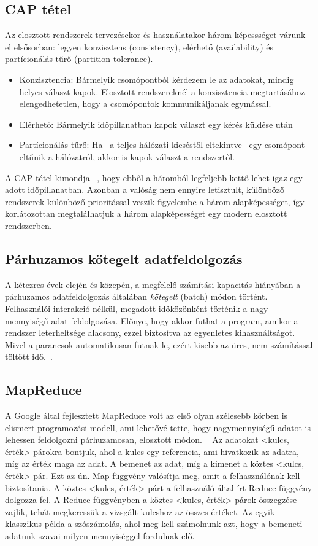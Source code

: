 \documentclass[a4paper,12pt]{article}
\begin{document}
\subsection{CAP tétel}
Az elosztott rendszerek tervezésekor és használatakor három képessséget várunk el elsősorban: legyen konzisztens (consistency), elérhető (availability) és partícionálás-tűrő (partition tolerance). 
\begin{itemize}
\item Konzisztencia: Bármelyik csomópontból kérdezem le az adatokat, mindig helyes választ kapok. Elosztott rendszereknél a konzisztencia megtartásához elengedhetetlen, hogy a csomópontok kommunikáljanak egymással. 
\item Elérhető: Bármelyik időpillanatban kapok választ egy kérés küldése után
\item Partícionálás-tűrő: Ha --a teljes hálózati kieséstől eltekintve-- egy csomópont eltűnik a hálózatról, akkor is kapok választ a rendszertől.
\end{itemize}
A CAP tétel kimondja ~\cite{cap}, hogy ebből a háromból legfeljebb kettő lehet igaz egy adott időpillanatban. Azonban a valóság nem ennyire letisztult, különböző rendszerek különböző prioritással veszik figyelembe a három alapképességet, így korlátozottan megtalálhatjuk a három alapképességet egy modern elosztott rendszerben. ~\cite{ecap}

\subsection{Párhuzamos kötegelt adatfeldolgozás}
A kétezres évek elején és közepén, a megfelelő számítási kapacitás hiányában a párhuzamos adatfeldolgozás általában \textsl{kötegelt} (batch) módon történt. Felhasználói interakció nélkül, megadott időközönként történik a nagy mennyiségű adat feldolgozása. Előnye, hogy akkor futhat a program, amikor a rendszer leterheltsége alacsony, ezzel biztosítva az egyenletes kihasználtságot. Mivel a parancsok automatikusan futnak le, ezért kisebb az üres, nem számítással töltött idő.~\cite{batch}.

\subsection{MapReduce}
A Google által fejlesztett MapReduce volt az első olyan szélesebb körben is elismert programozási modell, ami lehetővé tette, hogy nagymennyiségű adatot is lehessen feldolgozni párhuzamosan, elosztott módon. ~\cite{mapreduce} Az adatokat <kulcs, érték> párokra bontjuk, ahol a kulcs egy referencia, ami hivatkozik az adatra, míg az érték maga az adat. A bemenet az adat, míg a kimenet a köztes <kulcs, érték> pár. Ezt az ún. Map függvény valósítja meg, amit a felhasználónak kell biztosítania. A köztes <kulcs, érték> párt a felhasználó által írt Reduce függvény dolgozza fel. A Reduce függvényben a köztes <kulcs, érték> párok összegzése  zajlik, tehát megkeressük a vizsgált kulcshoz az összes értéket. \linebreak
Az egyik klasszikus példa a szószámolás, ahol meg kell számolnunk azt, hogy a bemeneti adatunk szavai milyen mennyiséggel fordulnak elő.
\end{document}
